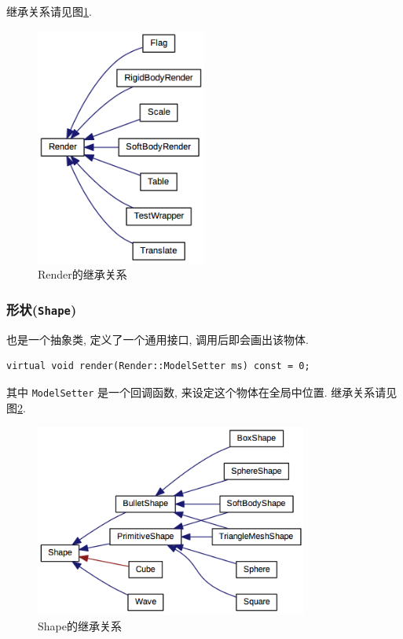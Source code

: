 \documentclass[11pt]{article}
\begin{document}
继承关系请见图\ref{fig:render_inherit}.

\begin{figure}[h]
\begin{center}
\includegraphics[width=0.5\textwidth]{html/inherit_graph_20.png}
\end{center}
\caption{Render的继承关系}
\label{fig:render_inherit}
\end{figure}
\subsubsection{形状(\texttt{Shape})}
\label{sec-3-4-3}
也是一个抽象类, 定义了一个通用接口, 调用后即会画出该物体. 
\begin{verbatim}
virtual void render(Render::ModelSetter ms) const = 0;
\end{verbatim}
其中 \texttt{ModelSetter} 是一个回调函数, 来设定这个物体在全局中位置.
继承关系请见图\ref{fig:shape_inherit}.

\begin{figure}[h]
\centering
\includegraphics[width=0.8\textwidth]{html/inherit_graph_23.png}
\caption{Shape的继承关系}
\label{fig:shape_inherit}
\end{figure}
\end{document}
